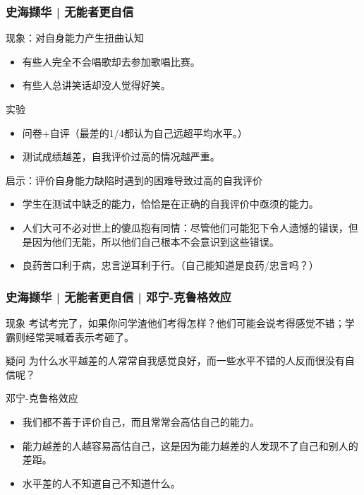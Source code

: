 \begin{frame}
  \frametitle{史海撷华 | 无能者更自信}
  \begin{block}{现象：对自身能力产生扭曲认知}
    \begin{itemize}
      \item 有些人完全不会唱歌却去参加歌唱比赛。
      \item 有些人总讲笑话却没人觉得好笑。
    \end{itemize}
  \end{block}
  \vspace{-0.3em}
  \pause
  \begin{block}{实验}
    \begin{itemize}
      \item 问卷+自评（最差的1/4都认为自己远超平均水平。）
      \item 测试成绩越差，自我评价过高的情况越严重。
    \end{itemize}
  \end{block}
  \vspace{-0.3em}
  \pause
  \begin{block}{启示：评价自身能力缺陷时遇到的困难导致过高的自我评价}
    \begin{itemize}
      \item 学生在测试中缺乏的能力，恰恰是在正确的自我评价中亟须的能力。
      \item 人们大可不必对世上的傻瓜抱有同情：尽管他们可能犯下令人遗憾的错误，但是因为他们无能，所以他们自己根本不会意识到这些错误。
      \item 良药苦口利于病，忠言逆耳利于行。（自己能知道是良药/忠言吗？）
    \end{itemize}
  \end{block}
\end{frame}

\begin{frame}
  \frametitle{史海撷华 | 无能者更自信 | 邓宁-克鲁格效应}
  \begin{block}{现象}
    考试考完了，如果你问学渣他们考得怎样？他们可能会说考得感觉不错；学霸则经常哭喊着表示考砸了。
  \end{block}
  \pause
  \begin{block}{疑问}
    为什么水平越差的人常常自我感觉良好，而一些水平不错的人反而很没有自信呢？
  \end{block}
  \pause
  \begin{block}{\alert{邓宁-克鲁格效应}}
    \begin{itemize}
      \item 我们都不善于评价自己，而且常常会高估自己的能力。
      \item 能力越差的人越容易高估自己，这是因为能力越差的人发现不了自己和别人的差距。
      \item 水平差的人不知道自己不知道什么。
    \end{itemize}
  \end{block}
\end{frame}

